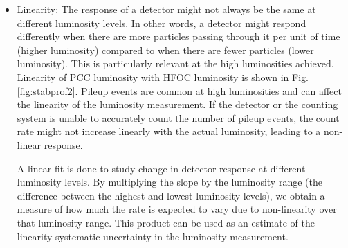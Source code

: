 \begin{itemize}
\newpage
\item Linearity: The response of a detector might not always be the same at different luminosity levels. In other words, a detector might respond differently when there are more particles passing through it per unit of time (higher luminosity) compared to when there are fewer particles (lower luminosity). This is particularly relevant at the high luminosities achieved. Linearity of PCC luminosity with HFOC luminosity is shown in Fig. \ref{fig:stabprof2}. 
Pileup events are common at high luminosities and can affect the linearity of the luminosity measurement. If the detector or the counting system is unable to accurately count the number of pileup events, the count rate might not increase linearly with the actual luminosity, leading to a non-linear response. %

A linear fit is done to study change in detector response at different luminosity levels. By multiplying the slope by the luminosity range (the difference between the highest and lowest luminosity levels), we obtain a measure of how much the  rate is expected to vary due to non-linearity over that luminosity range. This product can be used as an estimate of the linearity systematic uncertainty in the luminosity measurement.



\end{itemize}

